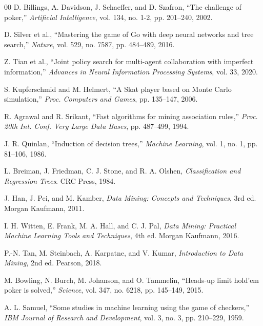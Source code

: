 \documentclass[conference]{IEEEtran}
\begin{document}
\begin{thebibliography}{00}
 D. Billings, A. Davidson, J. Schaeffer, and D. Szafron, ``The challenge of poker,'' \textit{Artificial Intelligence}, vol. 134, no. 1-2, pp. 201--240, 2002.

 D. Silver et al., ``Mastering the game of Go with deep neural networks and tree search,'' \textit{Nature}, vol. 529, no. 7587, pp. 484--489, 2016.

 Z. Tian et al., ``Joint policy search for multi-agent collaboration with imperfect information,'' \textit{Advances in Neural Information Processing Systems}, vol. 33, 2020.

 S. Kupferschmid and M. Helmert, ``A Skat player based on Monte Carlo simulation,'' \textit{Proc. Computers and Games}, pp. 135--147, 2006.

 R. Agrawal and R. Srikant, ``Fast algorithms for mining association rules,'' \textit{Proc. 20th Int. Conf. Very Large Data Bases}, pp. 487--499, 1994.

 J. R. Quinlan, ``Induction of decision trees,'' \textit{Machine Learning}, vol. 1, no. 1, pp. 81--106, 1986.

 L. Breiman, J. Friedman, C. J. Stone, and R. A. Olshen, \textit{Classification and Regression Trees}. CRC Press, 1984.

 J. Han, J. Pei, and M. Kamber, \textit{Data Mining: Concepts and Techniques}, 3rd ed. Morgan Kaufmann, 2011.

 I. H. Witten, E. Frank, M. A. Hall, and C. J. Pal, \textit{Data Mining: Practical Machine Learning Tools and Techniques}, 4th ed. Morgan Kaufmann, 2016.

 P.-N. Tan, M. Steinbach, A. Karpatne, and V. Kumar, \textit{Introduction to Data Mining}, 2nd ed. Pearson, 2018.

 M. Bowling, N. Burch, M. Johanson, and O. Tammelin, ``Heads-up limit hold'em poker is solved,'' \textit{Science}, vol. 347, no. 6218, pp. 145--149, 2015.

 A. L. Samuel, ``Some studies in machine learning using the game of checkers,'' \textit{IBM Journal of Research and Development}, vol. 3, no. 3, pp. 210--229, 1959.
\end{thebibliography}
\end{document}
